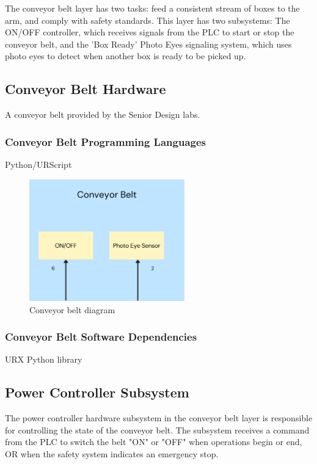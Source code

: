The conveyor belt layer has two tasks: feed a consistent stream of boxes to the arm, and comply with safety standards. This layer has two subsystems: The ON/OFF controller, which receives signals from the PLC to start or stop the conveyor belt, and the 'Box Ready' Photo Eyes signaling system, which uses photo eyes to detect when another box is ready to be picked up.

\subsection{Conveyor Belt Hardware}
A conveyor belt provided by the Senior Design labs.

\subsubsection{Conveyor Belt Programming Languages}
Python/URScript

\begin{figure}[h!]
\centering
 \includegraphics[width=0.60\textwidth]{images/conveyor.png}
 \caption{Conveyor belt diagram}
\end{figure}

\subsubsection{Conveyor Belt Software Dependencies}
URX Python library

\subsection{Power Controller Subsystem}
The power controller hardware subsystem in the conveyor belt layer is responsible for controlling the state of the conveyor belt. The subsystem receives a command from the PLC to switch the belt "ON" or "OFF" when operations begin or end, OR when the safety system indicates an emergency stop.

